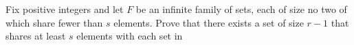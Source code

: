 Fix positive integers  and let $F$ be an infinite family of sets, each of size  no two of which share fewer than $s$ elements. Prove that there exists a set of size $r-1$ that shares at least $s$ elements with each set in 